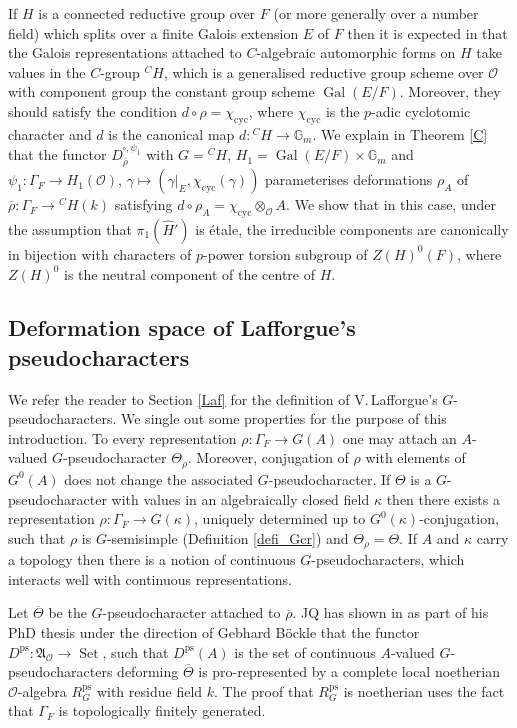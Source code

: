 \documentclass{amsart}
\theoremstyle{definition}
\theoremstyle{remark}
\DeclareMathOperator{\Gal}{Gal}
\DeclareMathOperator{\Set}{Set}
\newcommand{\Aa}{\mathfrak A}
\newcommand{\OO}{\mathcal O}
\newcommand{\rhobar}{\overline{\rho}}
\newcommand{\Gm}{\mathbb G_{m}}
\newcommand{\ps}{\mathrm{ps}}
\newcommand{\cyc}{\mathrm{cyc}}
\newcommand{\Thetabar}{\overline{\Theta}}
\begin{document}
If $H$ is a connected reductive group over $F$ (or more generally over a number field) which splits over a finite Galois extension $E$ of $F$  then it is expected  in \cite{BG} that the Galois representations
attached to $C$-algebraic automorphic forms on $H$ take values in the $C$-group ${}^C H$, which is  a generalised reductive group scheme over $\OO$
with component group the constant group scheme $\Gal(E/F)$. 
Moreover, they should satisfy the condition $d\circ \rho= \chi_{\cyc}$, where $\chi_{\cyc}$ is the $p$-adic cyclotomic character and 
$d$ is the canonical map $d:{}^C H\rightarrow \Gm$. We explain in Theorem \ref{C} that the functor $D^{\square,\psi_1}_{\rhobar}$  with $G={}^C H$, $H_1= \Gal(E/F)\times \Gm$ and 
$\psi_1: \Gamma_F \rightarrow H_1(\OO)$,  $\gamma \mapsto (\gamma|_E, \chi_{\cyc}(\gamma))$ parameterises deformations $\rho_A$ of 
$\rhobar: \Gamma_F \rightarrow {}^CH(k)$ satisfying $d\circ \rho_A = \chi_{\cyc}\otimes_{\OO} A$. We show that in this case, under the assumption 
that $\pi_1(\widehat{H}')$ is \'etale, 
the irreducible components are canonically in bijection with characters of $p$-power torsion subgroup of $Z(H)^0(F)$,
where $Z(H)^0$ is the neutral component of the centre of $H$. 

\subsection{Deformation space of Lafforgue's pseudocharacters}\label{intro_Laf}
We refer the reader to Section \ref{Laf} for the definition of 
V.\,Lafforgue's $G$-pseudocharacters. We single out some properties for the purpose of this introduction. To every representation 
$\rho: \Gamma_F \rightarrow G(A)$ one may attach an $A$-valued $G$-pseudocharacter $\Theta_{\rho}$. Moreover, conjugation of  $\rho$  with elements of $G^0(A)$ 
does not change the associated $G$-pseudocharacter. If $\Theta$ is a $G$-pseudocharacter with values in an algebraically closed field $\kappa$ 
then there exists a representation $\rho: \Gamma_F \rightarrow G(\kappa)$, uniquely determined up to $G^0(\kappa)$-conjugation, such that $\rho$ is  $G$-semisimple 
(Definition \ref{defi_Gcr}) and 
$\Theta_{\rho}=\Theta$. If $A$ and $\kappa$ carry a topology then there is a notion of continuous $G$-pseudocharacters, which interacts well with
continuous representations. 

Let $\Thetabar$ be the $G$-pseudocharacter attached to $\rhobar$. JQ has shown in \cite{quast} as part of his PhD thesis under the direction of Gebhard B\"ockle 
that the functor $D^{\ps}:\Aa_{\OO}\rightarrow \Set$, such that $D^{\ps}(A)$ is the set of continuous $A$-valued $G$-pseudocharacters deforming $\Thetabar$ 
is pro-represented by a complete local noetherian $\OO$-algebra $R^{\ps}_G$ with residue field $k$. The proof that $R^{\ps}_G$ is noetherian uses 
the fact that $\Gamma_F$ is topologically finitely generated. 
\end{document}
